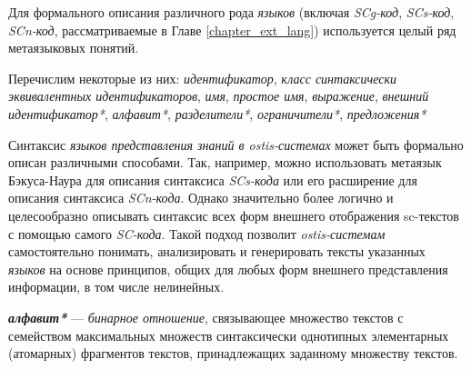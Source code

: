 \begin{SCn}


    \begin{scnindent}
    \end{scnindent}

\end{SCn}

Для формального описания различного рода \textit{языков} (включая \textit{SCg-код}, \textit{SCs-код}, \textit{SCn-код}, рассматриваемые в Главе \ref{chapter_ext_lang}) используется целый ряд метаязыковых понятий.

Перечислим некоторые из них: \textit{идентификатор}, \textit{класс синтаксически эквивалентных идентификаторов}, \textit{имя}, \textit{простое имя}, \textit{выражение}, \textit{внешний идентификатор*}, \textit{алфавит*}, \textit{разделители*}, \textit{ограничители*}, \textit{предложения*}

Синтаксис \textit{языков представления знаний в ostis-системах} может быть формально описан различными способами.
Так, например, можно использовать метаязык Бэкуса-Наура для описания синтаксиса \textit{SCs-кода} или его расширение для описания синтаксиса \textit{SCn-кода}.
Однако значительно более логично и целесообразно описывать синтаксис всех форм внешнего отображения sc-текстов с помощью самого \textit{SC-кода}.
Такой подход позволит \textit{ostis-системам} самостоятельно понимать, анализировать и генерировать тексты указанных \textit{языков} на основе принципов, общих для любых форм внешнего представления информации, в том числе нелинейных.

\textbf{\textit{алфавит*}} --- \textit{бинарное отношение}, связывающее множество текстов с  семейством максимальных множеств синтаксически однотипных элементарных (атомарных) фрагментов текстов, принадлежащих заданному множеству текстов.

\begin{SCn}



\end{SCn}

